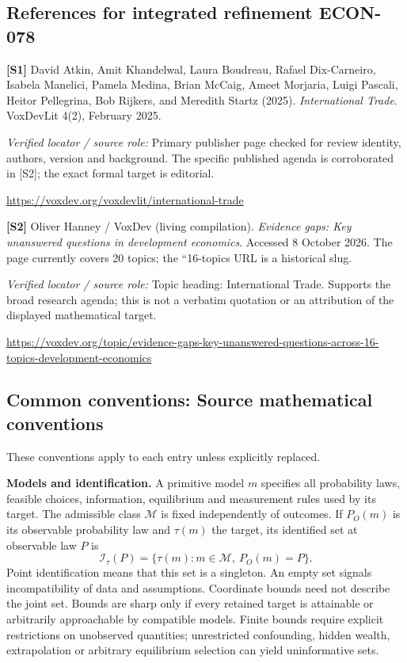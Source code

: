 \documentclass[11pt,a4paper]{article}
\begin{document}
\subsection*{References for integrated refinement ECON-078}
{\footnotesize\raggedright
\par\noindent\textbf{[S1]} David Atkin, Amit Khandelwal, Laura Boudreau, Rafael Dix-Carneiro, Isabela Manelici, Pamela Medina, Brian McCaig, Ameet Morjaria, Luigi Pascali, Heitor Pellegrina, Bob Rijkers, and Meredith Startz (2025). \emph{International Trade}. VoxDevLit 4(2), February 2025.\par \textit{Verified locator / source role:} Primary publisher page checked for review identity, authors, version and background. The specific published agenda is corroborated in [S2]; the exact formal target is editorial.\par \url{https://voxdev.org/voxdevlit/international-trade}\par\smallskip
\par\noindent\textbf{[S2]} Oliver Hanney / VoxDev (living compilation). \emph{Evidence gaps: Key unanswered questions in development economics}. Accessed 8 October 2026. The page currently covers 20 topics; the ``16-topics URL is a historical slug.\par \textit{Verified locator / source role:} Topic heading: International Trade. Supports the broad research agenda; this is not a verbatim quotation or an attribution of the displayed mathematical target.\par \url{https://voxdev.org/topic/evidence-gaps-key-unanswered-questions-across-16-topics-development-economics}\par\smallskip
}

\subsection*{Common conventions: Source mathematical conventions}

These conventions apply to each entry unless explicitly replaced.

\textbf{Models and identification.} A primitive model \(m\) specifies all probability laws, feasible choices, information, equilibrium and measurement rules used by its target. The admissible class \(\mathcal M\) is fixed independently of outcomes. If \(P_O(m)\) is its observable probability law and \(\tau(m)\) the target, its identified set at observable law \(P\) is
\[
 \mathcal I_\tau(P)=\{\tau(m):m\in\mathcal M,\ P_O(m)=P\}.
\]
Point identification means that this set is a singleton. An empty set signals incompatibility of data and assumptions. Coordinate bounds need not describe the joint set. Bounds are sharp only if every retained target is attainable or arbitrarily approachable by compatible models. Finite bounds require explicit restrictions on unobserved quantities; unrestricted confounding, hidden wealth, extrapolation or arbitrary equilibrium selection can yield uninformative sets.
\end{document}
